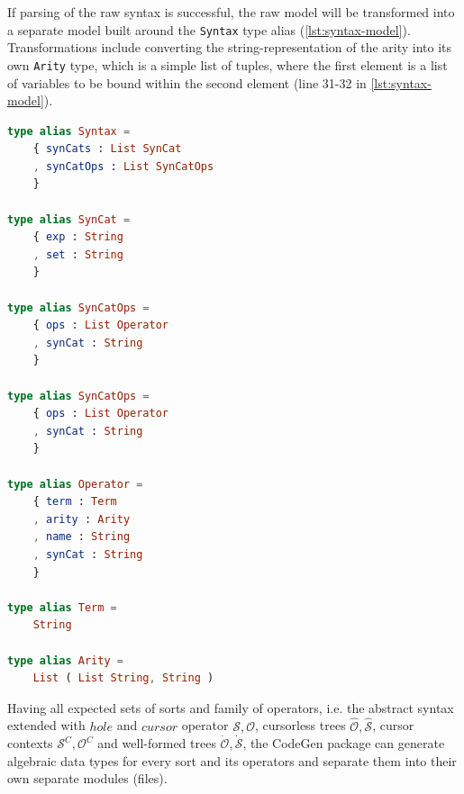 If parsing of the raw syntax is successful, the raw model will
be transformed into a separate model built around the \texttt{Syntax}
type alias (\cref{lst:syntax-model}).
Transformations include converting the string-representation of the arity
into its own \texttt{Arity} type, which is a simple list of tuples,
where the first element is a list of variables to be bound within the second element (line 31-32 in \cref{lst:syntax-model}).

\begin{minipage}{\textwidth}
  \begin{lstlisting}[language=elm,style=inline,caption={Syntax model},label={lst:syntax-model}]
type alias Syntax =
    { synCats : List SynCat
    , synCatOps : List SynCatOps
    }

type alias SynCat =
    { exp : String
    , set : String
    }

type alias SynCatOps =
    { ops : List Operator
    , synCat : String
    }

type alias SynCatOps =
    { ops : List Operator
    , synCat : String
    }

type alias Operator =
    { term : Term
    , arity : Arity
    , name : String
    , synCat : String
    }

type alias Term =
    String

type alias Arity =
    List ( List String, String )
\end{lstlisting}
\end{minipage}

Having all expected sets of sorts and family of operators,
i.e. the abstract syntax extended with $hole$ and $cursor$ operator $\mathcal{S},
  \mathcal{O}$, cursorless trees $\hat{\mathcal{O}},\hat{\mathcal{S}}$,
cursor contexts $\mathcal{S}^C,\mathcal{O}^C$ and
well-formed trees $\dot{\mathcal{O}},\dot{\mathcal{S}}$,
the CodeGen package can generate algebraic data types for every sort and its operators
and separate them into their own separate modules (files).

